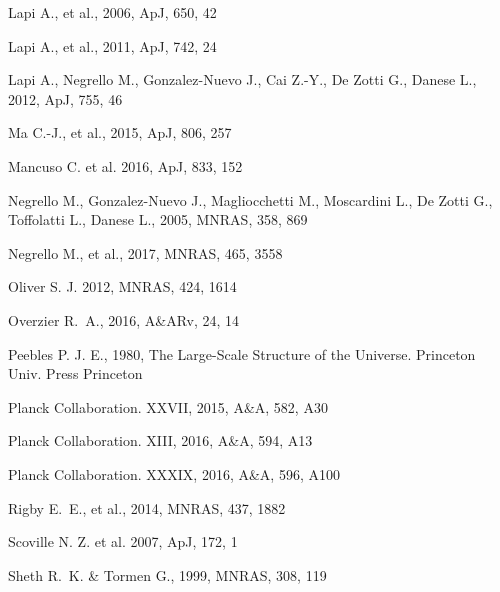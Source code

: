 \documentclass[useAMS,usenatbib]{mn2e}
\begin{document}
\begin{thebibliography}{}
 Lapi A., et al., 2006, ApJ, 650, 42

 Lapi A., et al., 2011, ApJ, 742, 24

 Lapi A., Negrello M., Gonzalez-Nuevo J., Cai Z.-Y.,
De Zotti G., Danese L., 2012, ApJ, 755, 46

 Ma C.-J., et al., 2015, ApJ, 806, 257

 Mancuso C. et al. 2016, ApJ, 833, 152


  Negrello M., Gonzalez-Nuevo J., Magliocchetti M., Moscardini L., De
  Zotti G., Toffolatti L., Danese L., 2005, MNRAS, 358, 869

 Negrello M., et al., 2017, MNRAS, 465, 3558

 Oliver S. J. 2012, MNRAS, 424, 1614

 Overzier R.~A., 2016, A\&ARv, 24, 14

 Peebles P. J. E., 1980, The Large-Scale Structure
of the Universe. Princeton Univ. Press Princeton

 Planck Collaboration. XXVII, 2015, A\&A, 582, A30

 Planck Collaboration. XIII, 2016, A\&A, 594, A13

 Planck Collaboration. XXXIX, 2016, A\&A, 596, A100

 Rigby E.~E., et al., 2014, MNRAS, 437, 1882

 Scoville N. Z. et al. 2007, ApJ, 172, 1

 Sheth R.~K. \& Tormen G., 1999, MNRAS, 308, 119


\end{thebibliography}
\end{document}

